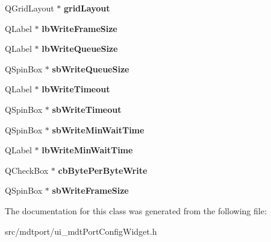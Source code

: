 \begin{DoxyCompactItemize}
\item 
\hypertarget{class_ui__mdt_port_config_widget_aa21a859343b5127133a6fa15f52bf74f}{
QGridLayout $\ast$ {\bfseries gridLayout}}
\label{class_ui__mdt_port_config_widget_aa21a859343b5127133a6fa15f52bf74f}

\item 
\hypertarget{class_ui__mdt_port_config_widget_a1d6c9086b1b1546c87df1fbaa3d68470}{
QLabel $\ast$ {\bfseries lbWriteFrameSize}}
\label{class_ui__mdt_port_config_widget_a1d6c9086b1b1546c87df1fbaa3d68470}

\item 
\hypertarget{class_ui__mdt_port_config_widget_a7f57346f1e11a863d0b77664edf6a671}{
QLabel $\ast$ {\bfseries lbWriteQueueSize}}
\label{class_ui__mdt_port_config_widget_a7f57346f1e11a863d0b77664edf6a671}

\item 
\hypertarget{class_ui__mdt_port_config_widget_ab5ded09564d59f57338a99642c8ad739}{
QSpinBox $\ast$ {\bfseries sbWriteQueueSize}}
\label{class_ui__mdt_port_config_widget_ab5ded09564d59f57338a99642c8ad739}

\item 
\hypertarget{class_ui__mdt_port_config_widget_aa0a486c1023d9f7d4e133ae86a826cc7}{
QLabel $\ast$ {\bfseries lbWriteTimeout}}
\label{class_ui__mdt_port_config_widget_aa0a486c1023d9f7d4e133ae86a826cc7}

\item 
\hypertarget{class_ui__mdt_port_config_widget_a146b41c99efbf3042b3eda59b18d3fe8}{
QSpinBox $\ast$ {\bfseries sbWriteTimeout}}
\label{class_ui__mdt_port_config_widget_a146b41c99efbf3042b3eda59b18d3fe8}

\item 
\hypertarget{class_ui__mdt_port_config_widget_a4740ead5e15cd5a13200123494aabdd4}{
QSpinBox $\ast$ {\bfseries sbWriteMinWaitTime}}
\label{class_ui__mdt_port_config_widget_a4740ead5e15cd5a13200123494aabdd4}

\item 
\hypertarget{class_ui__mdt_port_config_widget_a0a810127fbdacd283615f23c7e7066f1}{
QLabel $\ast$ {\bfseries lbWriteMinWaitTime}}
\label{class_ui__mdt_port_config_widget_a0a810127fbdacd283615f23c7e7066f1}

\item 
\hypertarget{class_ui__mdt_port_config_widget_a7365d7de9acfd1541849b65ffa1d9cae}{
QCheckBox $\ast$ {\bfseries cbBytePerByteWrite}}
\label{class_ui__mdt_port_config_widget_a7365d7de9acfd1541849b65ffa1d9cae}

\item 
\hypertarget{class_ui__mdt_port_config_widget_a52ec537c07730bc8bb402789ccb51774}{
QSpinBox $\ast$ {\bfseries sbWriteFrameSize}}
\label{class_ui__mdt_port_config_widget_a52ec537c07730bc8bb402789ccb51774}

\end{DoxyCompactItemize}


The documentation for this class was generated from the following file:\begin{DoxyCompactItemize}
\item 
src/mdtport/ui\_\-mdtPortConfigWidget.h\end{DoxyCompactItemize}
